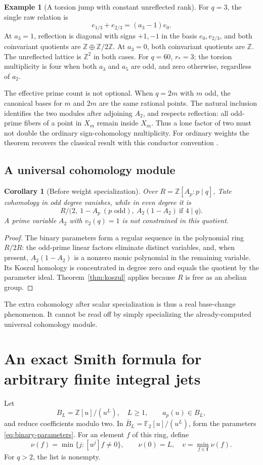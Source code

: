 \documentclass[11pt]{article}
\numberwithin{equation}{section}
\newtheorem{corollary}[theorem]{Corollary}
\theoremstyle{definition}
\newtheorem{example}[theorem]{Example}
\theoremstyle{remark}
\newcommand{\Z}{\mathbb Z}
\newcommand{\F}{\mathbb{F}_2}
\begin{document}
\begin{example}[A torsion jump with constant unreflected rank]
For $q=3$, the single raw relation is
\[
 e_{1/3}+e_{2/3}=(a_3-1)e_0.
\]
At $a_3=1$, reflection is diagonal with signs $+1,-1$ in the basis
$e_0,e_{2/3}$, and both coinvariant quotients are
$\Z\oplus\Z/2\Z$. At $a_3=0$, both coinvariant quotients are
$\Z$. The unreflected lattice is $\Z^2$ in both cases.
For $q=60$, $r_*=3$; the torsion multiplicity is four when both $a_3$
and $a_5$ are odd, and zero otherwise, regardless of $a_2$.
\end{example}

The effective prime count is not optional. When $q=2m$ with $m$ odd,
the canonical bases for $m$ and $2m$ are the same rational points.
The natural inclusion identifies the two modules after adjoining $A_2$,
and respects reflection: all odd-prime fibers of a point in $X_m$ remain
inside $X_m$. Thus a lone factor of two must not double the ordinary
sign-cohomology multiplicity. For ordinary weights the theorem recovers
the classical result with this conductor convention
\cite{OuyangSign}.

\subsection{A universal cohomology module}
\begin{corollary}[Before weight specialization]
\label{cor:universal-tate}
Over $R=\Z[A_p:p\mid q]$, Tate cohomology in odd degree vanishes, while
in even degree it is
\[
 R\big/\bigl(2,\ 1-A_p\ (p\text{ odd}),\
 A_2(1-A_2)\ \text{if }4\mid q\bigr).
\]
A prime variable $A_2$ with $v_2(q)=1$ is not constrained in this quotient.
\end{corollary}
\begin{proof}
The binary parameters form a regular sequence in the polynomial ring
$R/2R$: the odd-prime linear factors eliminate distinct variables, and,
when present, $A_2(1-A_2)$ is a nonzero monic polynomial in the remaining
variable. Its Koszul homology is concentrated in degree zero and equals
the quotient by the parameter ideal. Theorem~\ref{thm:koszul} applies
because $R$ is free as an abelian group.
\end{proof}
The extra cohomology after scalar specialization is thus a real
base-change phenomenon. It cannot be read off by simply specializing
the already-computed universal cohomology module.

\section{An exact Smith formula for arbitrary finite integral jets}
\label{sec:jets}
Let
\[
 B_L=\Z[u]/(u^L),\quad L\ge1,\qquad
 a_p(u)\in B_L,
\]
and reduce coefficients modulo two. In
$\overline B_L=\F[u]/(u^L)$, form the parameters
\eqref{eq:binary-parameters}. For an element $f$ of this ring, define
\[
 \nu(f)=\min\{j:[u^j]f\ne0\},\qquad \nu(0)=L,
 \quad v=\min_{f\in\boldsymbol f}\nu(f).
\]
For $q>2$, the list is nonempty.
\end{document}

